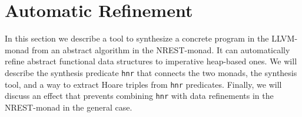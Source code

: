 \documentclass[acmsmall]{acmart}
\newcommand{\is}{\lstinline[language=isabelle]}
\begin{document}
  


      

    
    
\section{Automatic Refinement} \label{sec:sepref}

In this section we describe a tool to synthesize a concrete program in the LLVM-monad from an abstract algorithm in the NREST-monad. It can automatically refine abstract functional data structures to imperative heap-based ones.
We will describe the synthesis predicate \is{hnr} that connects the two monads, the synthesis tool, and a way to extract Hoare triples from \is{hnr} predicates.
%
Finally, we will discuss an effect that prevents combining \is{hnr} with data refinements in the NREST-monad in the general case.
\end{document}
